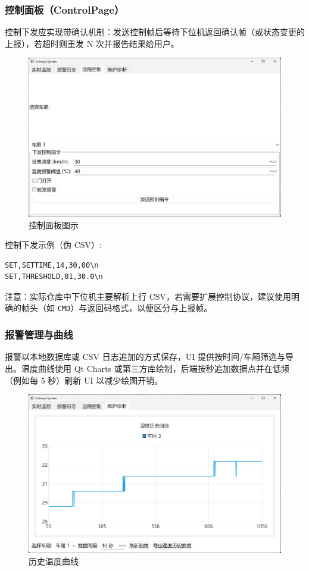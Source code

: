 \documentclass[12pt]{article}
\begin{document}
\subsubsection{控制面板（ControlPage）}
控制下发应实现带确认机制：发送控制帧后等待下位机返回确认帧（或状态变更的上报），若超时则重发 N 次并报告结果给用户。
\begin{figure}[H]
  \centering
  \includegraphics[width=\linewidth]{images/21-06-37.png}
  \caption{控制面板图示}
  \label{fig:control_panel}
\end{figure}

控制下发示例（伪 CSV）:
\begin{verbatim}
SET,SETTIME,14,30,00\n
SET,THRESHOLD,01,30.0\n
\end{verbatim}

注意：实际仓库中下位机主要解析上行 CSV，若需要扩展控制协议，建议使用明确的帧头（如 \texttt{CMD}）与返回码格式，以便区分与上报帧。

\subsubsection{报警管理与曲线}
报警以本地数据库或 CSV 日志追加的方式保存，UI 提供按时间/车厢筛选与导出。温度曲线使用 Qt Charts 或第三方库绘制，后端按秒追加数据点并在低频（例如每 5 秒）刷新 UI 以减少绘图开销。
\begin{figure}[H]
  \centering
  \includegraphics[width=\linewidth]{images/21-06-59.png}
  \caption{历史温度曲线}
  \label{fig:temperature_curve}
\end{figure}
\end{document}
